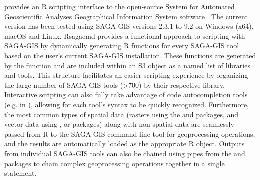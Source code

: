 \documentclass[a4paper]{book}
\begin{document}
\begin{Description}
 provides an R scripting interface to the open-source System
for Automated Geoscientific Analyses Geographical Information System software
. The current
version has been tested using SAGA-GIS versions 2.3.1 to 9.2 on Windows
(x64), macOS and Linux. Rsagacmd provides a functional approach to scripting
with SAGA-GIS by dynamically generating R functions for every SAGA-GIS tool
based on the user's current SAGA-GIS installation. These functions are
generated by the  function and are included within an
S3 object as a named list of libraries and tools. This structure facilitates
an easier scripting experience by organizing the large number of SAGA-GIS
tools (>700) by their respective library. Interactive scripting can also
fully take advantage of code autocompletion tools (e.g. in
), allowing for each tool's syntax to
be quickly recognized. Furthermore, the most common types of spatial data
(rasters using the  and  packages, and vector data
using ,  or  packages) along with non-spatial data
are seamlessly passed from R to the SAGA-GIS command line tool for
geoprocessing operations, and the results are automatically loaded as the
appropriate R object. Outputs from individual SAGA-GIS tools can also be
chained using pipes from the  and  packages to chain
complex geoprocessing operations together in a single statement.
\end{Description}
%
\end{document}
